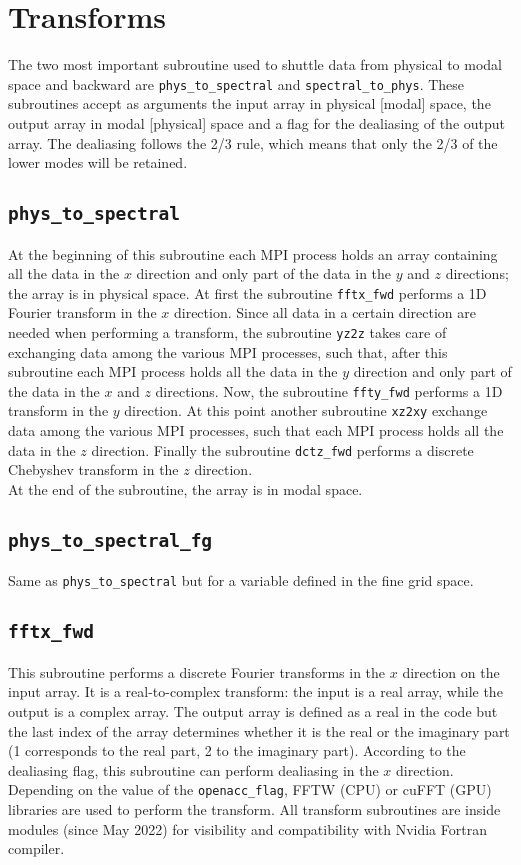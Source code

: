 \section{Transforms}
The two most important subroutine used to shuttle data from physical to modal space and backward are \texttt{phys\_to\_spectral} and \texttt{spectral\_to\_phys}. 
These subroutines accept as arguments the input array in physical [modal] space, the output array in modal [physical] space and a flag for the dealiasing of the output array. 
The dealiasing follows the 2/3 rule, which means that only the 2/3 of the lower modes will be retained.

\subsection{\texttt{phys\_to\_spectral}}
At the beginning of this subroutine each MPI process holds an array containing all the data in the $x$ direction and only part of the data in the $y$ and $z$ directions; the array is in physical space. 
At first the subroutine \texttt{fftx\_fwd} performs a 1D Fourier transform in the $x$ direction. Since all data in a certain direction are needed when performing a transform, the subroutine \texttt{yz2z} takes care of exchanging data among the various MPI processes, such that, after this subroutine each MPI process holds all the data in the $y$ direction and only part of the data in the $x$ and $z$ directions. Now, the subroutine \texttt{ffty\_fwd} performs a 1D transform in the $y$ direction. At this point another subroutine \texttt{xz2xy} exchange data among the various MPI processes, such that each MPI process holds all the data in the $z$ direction. Finally the subroutine \texttt{dctz\_fwd} performs a discrete Chebyshev transform in the $z$ direction.\\
At the end of the subroutine, the array is in modal space.

\subsection{\texttt{phys\_to\_spectral\_fg}}
Same as \texttt{phys\_to\_spectral} but for a variable defined in the fine grid space.

\subsection{\texttt{fftx\_fwd}}
\label{sec: fftx}
This subroutine performs a discrete Fourier transforms in the $x$ direction on the input array. It is a real-to-complex transform: the input is a real array, while the output is a complex array. 
The output array is defined as a real in the code but the last index of the array determines whether it is the real or the imaginary part (1 corresponds to the real part, 2 to the imaginary part). 
According to the dealiasing flag, this subroutine can perform dealiasing in the $x$ direction.
Depending on the value of the \texttt{openacc\_flag}, FFTW (CPU) or cuFFT (GPU) libraries are used to perform the transform.
All transform subroutines are inside modules (since May 2022) for visibility and compatibility with Nvidia Fortran compiler.

